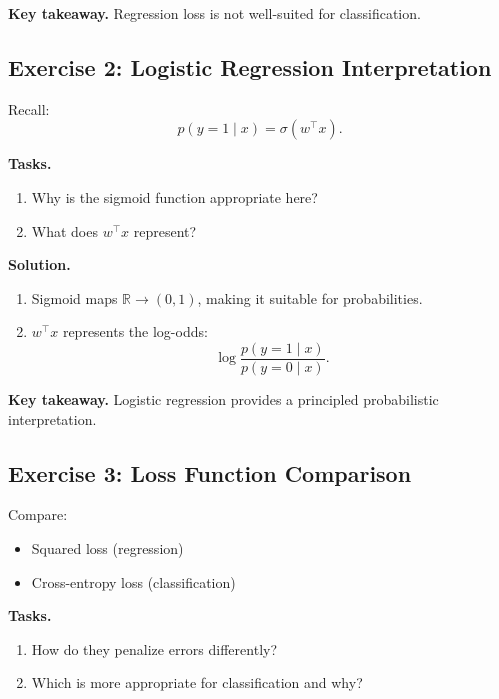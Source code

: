 \medskip

\noindent
\textbf{Key takeaway.}  
Regression loss is not well-suited for classification.

\subsection{Exercise 2: Logistic Regression Interpretation}

Recall:
\[
p(y=1 \mid x) = \sigma(w^\top x).
\]

\medskip

\noindent
\textbf{Tasks.}
\begin{enumerate}
    \item Why is the sigmoid function appropriate here?
    \item What does $w^\top x$ represent?
\end{enumerate}

\medskip

\noindent
\textbf{Solution.}

\begin{enumerate}
\item Sigmoid maps $\mathbb{R} \to (0,1)$, making it suitable for probabilities.

\item $w^\top x$ represents the log-odds:
\[
\log \frac{p(y=1 \mid x)}{p(y=0 \mid x)}.
\]
\end{enumerate}

\medskip

\noindent
\textbf{Key takeaway.}  
Logistic regression provides a principled probabilistic interpretation.

\subsection{Exercise 3: Loss Function Comparison}

Compare:

\begin{itemize}
    \item Squared loss (regression)
    \item Cross-entropy loss (classification)
\end{itemize}

\medskip

\noindent
\textbf{Tasks.}
\begin{enumerate}
    \item How do they penalize errors differently?
    \item Which is more appropriate for classification and why?
\end{enumerate}

